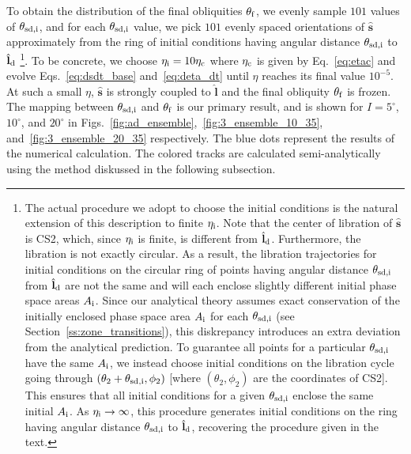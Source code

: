 \documentclass[twocolumn,twocolappendix]{aastex63}
\newcommand*{\bsmb}[1]{\boldsymbol{\mathbf{#1}}}
\newcommand*{\uv}[1]{\hat{\bsmb{#1}}}
\newcommand*{\p}[1]{\left(#1\right)}
\begin{document}
To obtain the distribution of the final obliquities $\theta_{\rm f}$, we evenly
sample $101$ values of $\theta_{\rm sd, i}$, and for each $\theta_{\rm sd, i}$
value, we pick $101$ evenly spaced orientations of $\uv{s}$ approximately from
the ring of initial conditions having angular distance $\theta_{\rm sd, i}$ to
$\uv{l}_{\rm d}$%
%
\footnote{The actual procedure we adopt to choose the initial conditions is the
natural extension of this description to finite $\eta_{\rm i}$. Note that the
center of libration of $\uv{s}$ is CS2, which, since $\eta_{\rm i}$ is finite,
is different from $\uv{l}_{\rm d}$. Furthermore, the libration is not exactly
circular. As a result, the libration trajectories for initial conditions on the
circular ring of points having angular distance $\theta_{\rm sd, i}$ from
$\uv{l}_{\rm d}$ are not the same and will each enclose slightly different
initial phase space areas $A_{\rm i}$. Since our analytical theory assumes exact
conservation of the initially enclosed phase space area $A_{\rm i}$ for each
$\theta_{\rm sd, i}$ (see Section~\ref{ss:zone_transitions}), this diskrepancy
introduces an extra deviation from the analytical prediction. To guarantee all
points for a particular $\theta_{\rm sd, i}$ have the same $A_{\rm i}$, we
instead choose initial conditions on the libration cycle going through
$\p{\theta_2 + \theta_{\rm sd, i}, \phi_2}$ [where $\p{\theta_2, \phi_2}$ are
the coordinates of CS2]. This ensures that all initial conditions for a given
$\theta_{\rm sd, i}$ enclose the same initial $A_{\rm i}$. As $\eta_{\rm i} \to
\infty$, this procedure generates initial conditions on the ring having angular
distance $\theta_{\rm sd, i}$ to $\uv{l}_{\rm d}$, recovering the procedure
given in the text.}.
%
To be concrete, we choose $\eta_{\rm i} = 10\eta_{\rm c}$ where $\eta_{\rm c}$
is given by Eq.~\eqref{eq:etac} and evolve Eqs.~\eqref{eq:dsdt_base}
and~\eqref{eq:deta_dt} until $\eta$ reaches its final value $10^{-5}$. At such a
small $\eta$, $\uv{s}$ is strongly coupled to $\uv{l}$ and the final obliquity
$\theta_{\rm f}$ is frozen. The mapping between $\theta_{\rm sd, i}$ and
$\theta_{\rm f}$ is our primary result, and is shown for $I = 5^\circ$,
$10^\circ$, and $20^\circ$ in
Figs.~\ref{fig:ad_ensemble},~\ref{fig:3_ensemble_10_35},
and~\ref{fig:3_ensemble_20_35} respectively. The blue dots represent the results
of the numerical calculation. The colored tracks are calculated
semi-analytically using the method diskussed in the following subsection.
\end{document}
